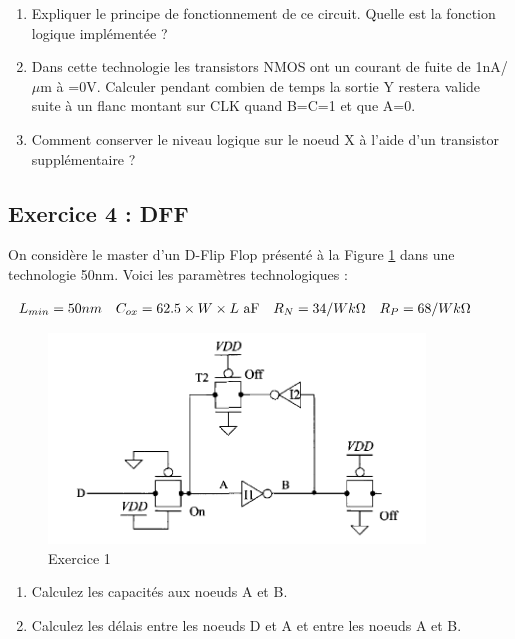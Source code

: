 \documentclass[paper=a4, fontsize=11pt]{article} %
\numberwithin{equation}{section} %
\numberwithin{figure}{section} %
\numberwithin{table}{section} %
\begin{document}
\begin{enumerate}
\item Expliquer le principe de fonctionnement de ce circuit. Quelle est la fonction logique implémentée ?
\item Dans cette technologie les transistors NMOS ont un courant de fuite de 1nA/$\mu$m à \vgs=0V. Calculer pendant combien de temps la sortie Y restera valide suite à un flanc montant sur CLK quand B=C=1 et que A=0.
\item Comment conserver le niveau logique sur le noeud X à l'aide d'un transistor supplémentaire ?
\end{enumerate}

\newpage
\subsection*{Exercice 4 : DFF}
On considère le master d'un D-Flip Flop présenté à la Figure \ref{fig8-4} dans une technologie 50nm. Voici les paramètres technologiques :
\begin{center} $ \begin{array}{l l l l} L_{min} = 50nm & C_{ox} = 62.5\times W \times L\text{ aF} & R_N=34/W k \Omega& R_P=68/W k\Omega\\ \end{array}$\end{center}

\begin{figure}[!htbp]
   \centering
   \includegraphics[width=10cm]{figure/fig8-4.png}
   \caption{Exercice 1}
   \label{fig8-4}
\end{figure}

\begin{enumerate}
\item Calculez les capacités aux noeuds A et B.
\item Calculez les délais entre les noeuds D et A et entre les noeuds A et B.
\end{enumerate}
\end{document}
